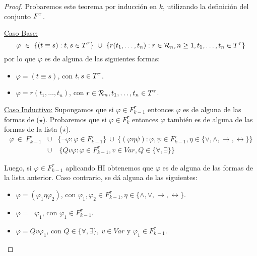   \begin{proof}
    \PN Probaremos este teorema por inducción en $k$, utilizando la definición del conjunto $F^{\tau}$.

    \vspace{3mm}
    \PN \underline{Caso Base:}
    \[
      \varphi \ \in \ \{(t \equiv s): t, s \in T^{\tau}\} \ \cup \ \{r(t_{1}, \dotsc, t_{n}): r \in \mathcal{R}_{n}, n \geq
      1, t_{1}, \dotsc, t_{n} \in T^{\tau}\}
    \]
    \PN por lo que $\varphi$ es de alguna de las siguientes formas:
    \begin{itemize}
      \item $\varphi = (t \equiv s)$, con $t, s \in T^{\tau}$.
      \item $\varphi = r(t_{1}, \dotsc, t_{n})$, con $r \in \mathcal{R}_{n}, t_{1}, \dotsc, t_{n} \in T^{\tau}$.
    \end{itemize}

    \vspace{3mm}
		\PN \underline{Caso Inductivo:} Supongamos que si $\varphi \in F_{k-1}^{\tau}$ entonces $\varphi$ es de alguna de
    las formas de ($\star$). Probaremos que si $\varphi \in F_{k}^{\tau}$ entonces $\varphi$ también es de alguna de las
    formas de la lista ($\star$).
    \begin{eqnarray*}
      \varphi \ \in \ F_{k-1}^{\tau} &\cup& \{\lnot \varphi: \varphi \in F_{k-1}^{\tau}\} \ \cup \ \{(\varphi \eta \psi):
        \varphi, \psi \in F_{k-1}^{\tau}, \eta \in \{\vee, \wedge, \rightarrow, \leftrightarrow\}\} \\
      &\cup& \ \{Qv\varphi: \varphi \in F_{k-1}^{\tau}, v \in Var, Q \in \{\forall, \exists\}\}
    \end{eqnarray*}

    \PN Luego, si $\varphi \in F_{k-1}^{\tau}$ aplicando HI obtenemos que $\varphi$ es de alguna de las formas de la
    lista anterior. Caso contrario, se dá alguna de las siguientes:
    \begin{itemize}
      \item $\varphi = (\varphi_{1} \eta \varphi_{2})$, con $\varphi_{1}, \varphi_{2} \in F_{k-1}^{\tau}, \eta \in
      \{\wedge, \vee, \rightarrow, \leftrightarrow\}$.
      \item $\varphi = \lnot \varphi_{1}$, con $\varphi_{1} \in F_{k-1}^{\tau}$.
      \item $\varphi = Qv\varphi_{1}$, con $Q \in \{\forall, \exists\}, \ v \in Var$ y $\varphi_{1} \in F_{k-1}^{\tau}$.
    \end{itemize}
  \end{proof}


